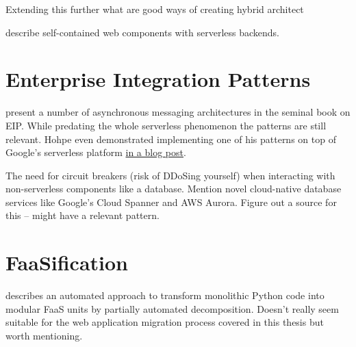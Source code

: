 Extending this further what are good ways of creating hybrid architect

\textcite{ast17webcomponent} describe self-contained web components with serverless backends.

\section{Enterprise Integration Patterns}

\textcite{hohpe2004enterprise} present a number of asynchronous messaging architectures in the seminal book on EIP. While predating the whole serverless phenomenon the patterns are still relevant. Hohpe even demonstrated implementing one of his patterns on top of Google's serverless platform \href{http://www.enterpriseintegrationpatterns.com/ramblings/google_cloud_functions.html}{in a blog post}.

The need for circuit breakers (risk of DDoSing yourself) when interacting with non-serverless components like a database. Mention novel cloud-native database services like Google's Cloud Spanner and AWS Aurora. Figure out a source for this -- \textcite{hohpe2004enterprise} might have a relevant pattern.

\section{FaaSification}

\textcite{spillner17transformpython} describes an automated approach to transform monolithic Python code into modular FaaS units by partially automated decomposition. Doesn't really seem suitable for the web application migration process covered in this thesis but worth mentioning.
